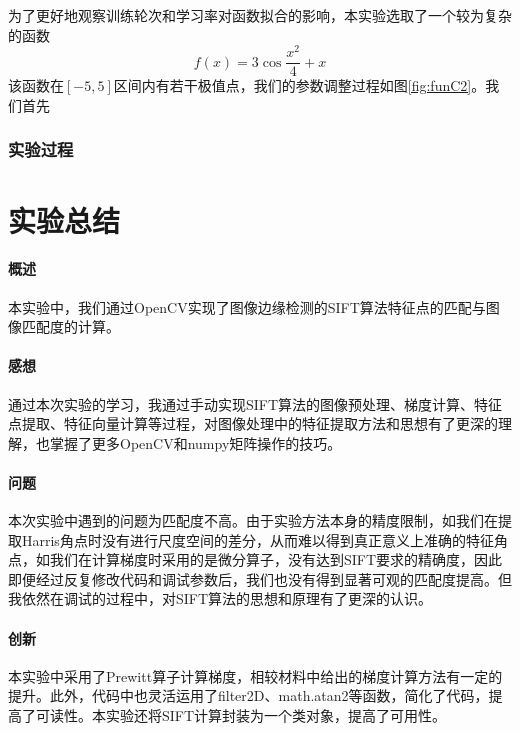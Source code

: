 \documentclass{article}
\begin{document}
为了更好地观察训练轮次和学习率对函数拟合的影响，本实验选取了一个较为复杂的函数 $$ f(x) = 3 \cos{\frac{x^2}{4}} +  x $$ 该函数在$[-5,5]$区间内有若干极值点，我们的参数调整过程如图\ref{fig:funC2}。我们首先



\subsubsection{实验过程}

\section{实验总结}
\paragraph{概述}
本实验中，我们通过OpenCV实现了图像边缘检测的SIFT算法特征点的匹配与图像匹配度的计算。

\paragraph{感想}
通过本次实验的学习，我通过手动实现SIFT算法的图像预处理、梯度计算、特征点提取、特征向量计算等过程，对图像处理中的特征提取方法和思想有了更深的理解，也掌握了更多OpenCV和numpy矩阵操作的技巧。

\paragraph{问题}
本次实验中遇到的问题为匹配度不高。由于实验方法本身的精度限制，如我们在提取Harris角点时没有进行尺度空间的差分，从而难以得到真正意义上准确的特征角点，如我们在计算梯度时采用的是微分算子，没有达到SIFT要求的精确度，因此即便经过反复修改代码和调试参数后，我们也没有得到显著可观的匹配度提高。但我依然在调试的过程中，对SIFT算法的思想和原理有了更深的认识。

\paragraph{创新}
本实验中采用了Prewitt算子计算梯度，相较材料中给出的梯度计算方法有一定的提升。此外，代码中也灵活运用了filter2D、math.atan2等函数，简化了代码，提高了可读性。本实验还将SIFT计算封装为一个类对象，提高了可用性。
\end{document}
